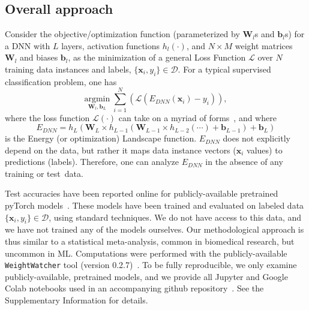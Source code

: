 \subsection{Overall approach}
\label{sxn:approach}


Consider the objective/optimization function (parameterized by $\mathbf{W}_{l}$s and $\mathbf{b}_{l}$s) for a DNN with $L$ layers, activation functions $h_{l}(\cdot)$, and $N\times M$ weight matrices $\mathbf{W}_{l}$ and biases $\mathbf{b}_{l}$, as 
the minimization of a general Loss Function $\mathcal{L}$ over $N$ training data instances and labels, $\{\mathbf{x}_{i},y_{i}\}\in\mathcal{D}$.
For a typical supervised classification problem, one has
\begin{equation}
\underset{\mathbf{W}_{l},\mathbf{b}_{L}}{\text{argmin}}\;\sum_{i=1}^{N}\left(\mathcal{L}(E_{DNN}(\mathbf{x}_{i})-y_{i})\right)  ,
\end{equation}
where the loss function $\mathcal{L}(\cdot)$ can take on a myriad of forms~\cite{JC17_TR}, and where
\begin{equation}
E_{DNN}=h_{L}(\mathbf{W}_{L}\times h_{L-1}(\mathbf{W}_{L-1}\times h_{L-2}(\cdots)+\mathbf{b}_{L-1})+\mathbf{b}_{L})
\label{eqn:dnn_energy}
\end{equation}
is the Energy (or optimization) Landscape function.  
$E_{DNN}$ does not explicitly depend on the data, but rather it maps data instance vectors ($\mathbf{x}_i$ values) to predictions (labels).
Therefore, one can analyze $E_{DNN}$ in the absence of any training or test~data. 

Test accuracies have been reported online for publicly-available pretrained pyTorch models~\cite{osmr}.
These models have been trained and evaluated on labeled data $\{\mathbf{x}_{i},y_{i}\}\in\mathcal{D}$, using standard techniques.  
We do not have access to this data, and we have not trained any of the models ourselves. 
Our methodological approach is thus similar to a statistical meta-analysis, common in biomedical research, but uncommon in ML.
%
Computations were performed with the publicly-available \texttt{WeightWatcher} tool (version 0.2.7)~\cite{weightwatcher_package}.
To be fully reproducible, we only examine publicly-available, pretrained models, and we provide all Jupyter and Google Colab notebooks used in an accompanying github repository~\cite{kdd20_sub_repo}.
See the Supplementary Information
for details.



